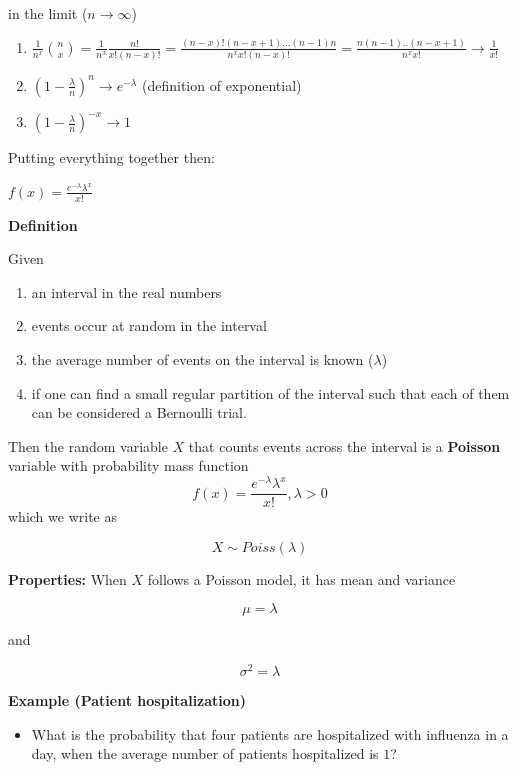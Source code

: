 \documentclass[
]{book}
\providecommand{\tightlist}{%
  \setlength{\itemsep}{0pt}\setlength{\parskip}{0pt}}
\begin{document}
in the limit (\(n \rightarrow \infty\))

\begin{enumerate}
\def\labelenumi{\arabic{enumi})}
\tightlist
\item
  \(\frac{1}{n^x}\binom n x =\frac{1}{n^x}\frac{n!}{x! (n-x)!}=\frac{(n-x)!(n-x+1)...(n-1)n}{n^x x! (n-x)!}=\frac{n(n-1)..(n-x+1)}{n^x x!} \rightarrow \frac{1}{x!}\)
\item
  \((1-\frac{\lambda}{n})^{n} \rightarrow e^{-\lambda}\) (definition of exponential)
\item
  \((1-\frac{\lambda}{n})^{-x} \rightarrow 1\)
\end{enumerate}

Putting everything together then:

\(f(x)= \frac{e^{-\lambda}\lambda^x}{x!}\)

\textbf{Definition}

Given

\begin{enumerate}
\def\labelenumi{\arabic{enumi})}
\tightlist
\item
  an interval in the real numbers
\item
  events occur at random in the interval
\item
  the average number of events on the interval is known (\(\lambda\))
\item
  if one can find a small regular partition of the interval such that each of them can be considered a Bernoulli trial.
\end{enumerate}

Then the random variable \(X\) that counts events across the interval is a \textbf{Poisson} variable with probability mass function\\
\[f(x)= \frac{e^{-\lambda}\lambda^x}{x!}, \lambda>0\]
which we write as

\[X \sim Poiss(\lambda)\]

\textbf{Properties:}
When \(X\) follows a Poisson model, it has mean and variance

\[\mu= \lambda\]

and

\[\sigma^2= \lambda\]

\textbf{Example (Patient hospitalization)}

\begin{itemize}
\tightlist
\item
  What is the probability that four patients are hospitalized with influenza in a day, when the average number of patients hospitalized is \(1\)?
\end{itemize}
\end{document}

